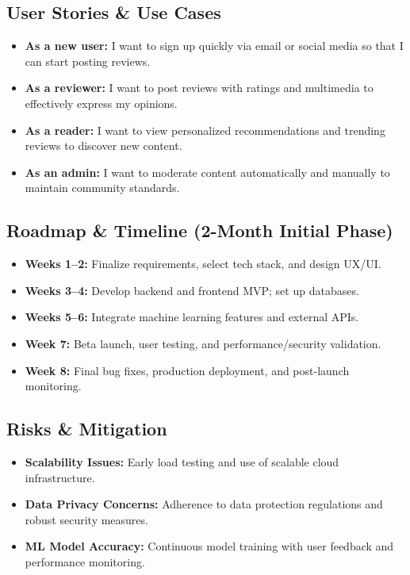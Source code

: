\documentclass[11pt]{article}
\begin{document}
\subsection{User Stories \& Use Cases}
\begin{itemize}[noitemsep]
    \item \textbf{As a new user:} I want to sign up quickly via email or social media so that I can start posting reviews.
    \item \textbf{As a reviewer:} I want to post reviews with ratings and multimedia to effectively express my opinions.
    \item \textbf{As a reader:} I want to view personalized recommendations and trending reviews to discover new content.
    \item \textbf{As an admin:} I want to moderate content automatically and manually to maintain community standards.
\end{itemize}

\subsection{Roadmap \& Timeline (2-Month Initial Phase)}
\begin{itemize}[noitemsep]
    \item \textbf{Weeks 1--2:} Finalize requirements, select tech stack, and design UX/UI.
    \item \textbf{Weeks 3--4:} Develop backend and frontend MVP; set up databases.
    \item \textbf{Weeks 5--6:} Integrate machine learning features and external APIs.
    \item \textbf{Week 7:} Beta launch, user testing, and performance/security validation.
    \item \textbf{Week 8:} Final bug fixes, production deployment, and post-launch monitoring.
\end{itemize}

\subsection{Risks \& Mitigation}
\begin{itemize}[noitemsep]
    \item \textbf{Scalability Issues:} Early load testing and use of scalable cloud infrastructure.
    \item \textbf{Data Privacy Concerns:} Adherence to data protection regulations and robust security measures.
    \item \textbf{ML Model Accuracy:} Continuous model training with user feedback and performance monitoring.
\end{itemize}
\end{document}
